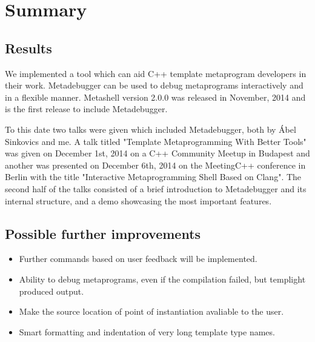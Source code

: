 
\chapter{Summary} \label{summary}

\section{Results}

We implemented a tool which can aid C++ template metaprogram developers in
their work. Metadebugger can be used to debug metaprograms interactively and in
a flexible manner. Metashell version 2.0.0\cite{github-releases} was released
in November, 2014 and is the first release to include Metadebugger.

To this date two talks were given which included Metadebugger, both by Ábel
Sinkovics and me. A talk titled "Template Metaprogramming With Better Tools"
was given on December 1st, 2014 on a C++ Community Meetup in
Budapest\cite{cpp-meetup} and another was presented on December 6th, 2014 on
the MeetingC++ conference in Berlin with the title "Interactive Metaprogramming
Shell Based on Clang"\cite{meeting-cpp}. The second half of the talks consisted
of a brief introduction to Metadebugger and its internal structure, and a demo
showcasing the most important features.

\section{Possible further improvements}

\begin{itemize}
    \item
        Further commands based on user feedback will be implemented.
    \item
        Ability to debug metaprograms, even if the compilation failed, but
        templight produced output.
    \item
        Make the source location of point of instantiation avaliable to the
        user.
    \item
        Smart formatting and indentation of very long template type names.
\end{itemize}
